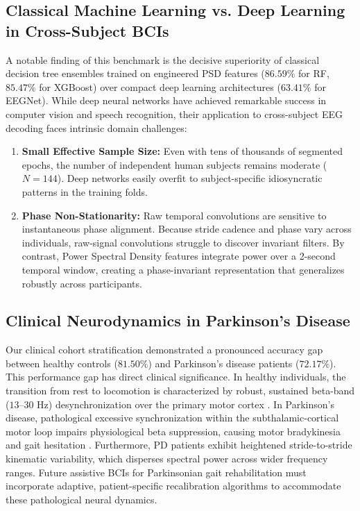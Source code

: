 \documentclass[review,12pt]{elsarticle}
\begin{document}
\subsection{Classical Machine Learning vs. Deep Learning in Cross-Subject BCIs}
A notable finding of this benchmark is the decisive superiority of classical decision tree ensembles trained on engineered PSD features ($86.59\%$ for RF, $85.47\%$ for XGBoost) over compact deep learning architectures ($63.41\%$ for EEGNet). While deep neural networks have achieved remarkable success in computer vision and speech recognition, their application to cross-subject EEG decoding faces intrinsic domain challenges:
\begin{enumerate}
    \item \textbf{Small Effective Sample Size:} Even with tens of thousands of segmented epochs, the number of independent human subjects remains moderate ($N = 144$). Deep networks easily overfit to subject-specific idiosyncratic patterns in the training folds.
    \item \textbf{Phase Non-Stationarity:} Raw temporal convolutions are sensitive to instantaneous phase alignment. Because stride cadence and phase vary across individuals, raw-signal convolutions struggle to discover invariant filters. By contrast, Power Spectral Density features integrate power over a 2-second temporal window, creating a phase-invariant representation that generalizes robustly across participants.
\end{enumerate}

\subsection{Clinical Neurodynamics in Parkinson's Disease}
Our clinical cohort stratification demonstrated a pronounced accuracy gap between healthy controls ($81.50\%$) and Parkinson's disease patients ($72.17\%$). This performance gap has direct clinical significance. In healthy individuals, the transition from rest to locomotion is characterized by robust, sustained beta-band ($13\text{--}30\text{ Hz}$) desynchronization over the primary motor cortex \cite{pfurtscheller2006bci, gwin2011electrocortical}. In Parkinson's disease, pathological excessive synchronization within the subthalamic-cortical motor loop impairs physiological beta suppression, causing motor bradykinesia and gait hesitation \cite{orban2024dataset, gilat2021locomotion}. Furthermore, PD patients exhibit heightened stride-to-stride kinematic variability, which disperses spectral power across wider frequency ranges. Future assistive BCIs for Parkinsonian gait rehabilitation must incorporate adaptive, patient-specific recalibration algorithms to accommodate these pathological neural dynamics.
\end{document}

